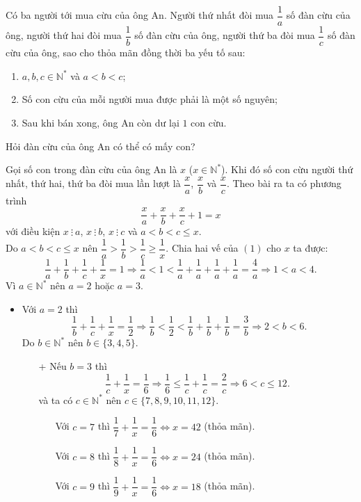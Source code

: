 \begin{bt}%
	Có ba người tới mua cừu của ông An. Người thứ nhất đòi mua $\dfrac{1}{a}$ số đàn cừu của ông, người thứ hai đòi mua $\dfrac{1}{b}$ số đàn cừu của ông, người thứ ba đòi mua $\dfrac{1}{c}$ số đàn cừu của ông, sao cho thỏa mãn đồng thời ba yếu tố sau:
	\begin{enumerate}[1)]
		\item $a,b,c\in\mathbb{N}^*$ và $a<b<c$;
		\item Số con cừu của mỗi người mua được phải là một số nguyên;
		\item Sau khi bán xong, ông An còn dư lại $1$ con cừu.
	\end{enumerate}
Hỏi đàn cừu của ông An có thể có mấy con?
\loigiai
{
Gọi số con trong đàn cừu của ông An là $x$ ($x\in\mathbb{N}^*$). Khi đó số con cừu người thứ nhất, thứ hai, thứ ba đòi mua lần lượt là $\dfrac{x}{a}$, $\dfrac{x}{b}$ và $\dfrac{x}{c}$. Theo bài ra ta có phương trình 
\[\dfrac{x}{a}+\dfrac{x}{b}+\dfrac{x}{c}+1=x\tag{1}\]
với điều kiện $x\ \vdots\ a$, $x\ \vdots\ b$, $x\ \vdots\ c$ và $a<b<c\le x$.\\
Do $a<b<c\le x$ nên $\dfrac{1}{a}>\dfrac{1}{b}>\dfrac{1}{c}\ge \dfrac{1}{x}$. Chia hai vế của $(1)$ cho $x$ ta được:
\[\dfrac{1}{a}+\dfrac{1}{b}+\dfrac{1}{c}+\dfrac{1}{x}=1\Rightarrow \dfrac{1}{a}<1<\dfrac{1}{a}+\dfrac{1}{a}+\dfrac{1}{a}+\dfrac{1}{a}=\dfrac{4}{a}\Rightarrow 1<a<4.\]
Vì $a\in\mathbb{N}^*$ nên $a=2$ hoặc $a=3$.
\begin{itemize}
	\item Với $a=2$ thì 
	\[\dfrac{1}{b}+\dfrac{1}{c}+\dfrac{1}{x}=\dfrac{1}{2}\Rightarrow \dfrac{1}{b}<\dfrac{1}{2}<\dfrac{1}{b}+\dfrac{1}{b}+\dfrac{1}{b}=\dfrac{3}{b}\Rightarrow 2<b<6.\]
	Do $b\in\mathbb{N}^*$ nên $b\in \{3,4,5\}$.
	\begin{itemize}
		\item [+] Nếu $b=3$ thì
		\[\dfrac{1}{c}+\dfrac{1}{x}=\dfrac{1}{6}\Rightarrow \dfrac{1}{6}\le \dfrac{1}{c}+\dfrac{1}{c}=\dfrac{2}{c}\Rightarrow 6<c\le 12. \]
		và ta có $c\in \mathbb{N}^*$ nên $c\in\{7,8,9,10,11,12\}$.
		\begin{itemize}
			\item [] Với $c=7$ thì $\dfrac{1}{7}+\dfrac{1}{x}=\dfrac{1}{6}\Leftrightarrow x=42$ (thỏa mãn).
			\item [] Với $c=8$ thì $\dfrac{1}{8}+\dfrac{1}{x}=\dfrac{1}{6}\Leftrightarrow x=24$ (thỏa mãn).
			\item [] Với $c=9$ thì $\dfrac{1}{9}+\dfrac{1}{x}=\dfrac{1}{6}\Leftrightarrow x=18$ (thỏa mãn).

\end{itemize}
\end{itemize}
\end{itemize}}
\end{bt}
